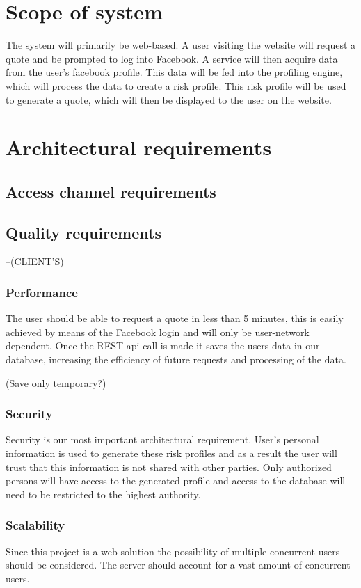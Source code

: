 \documentclass{article}
\begin{document}
\section{Scope of system}
The system will primarily be web-based. A user visiting the website will request a quote and be prompted to log into Facebook. A service will then acquire data from the user’s facebook profile. This data will be fed into the profiling engine, which will process the data to create a risk profile. This risk profile will be used to generate a quote, which will then be displayed to the user on the website.

\section{Architectural requirements}
	\subsection{Access channel requirements}
	
	\subsection{Quality requirements}
		--(CLIENT'S)
		\subsubsection{Performance}
		The user should be able to request a quote in less than 5 minutes, this is easily achieved by means of the Facebook login and will only be user-network dependent. Once the REST api call is made it saves the users data in our database, increasing the efficiency of future requests and processing of the data.
		
		(Save only temporary?)
		\subsubsection{Security}
		Security is our most important architectural requirement. User's personal information is used to generate these risk profiles and as a result the user will trust that this information is not shared with other parties. Only authorized persons will have access to the generated profile and access to the database will need to be restricted to the highest authority.
		\subsubsection{Scalability}
		Since this project is a web-solution the possibility of multiple concurrent users should be considered. The server should account for a vast amount of concurrent users.
\end{document}
